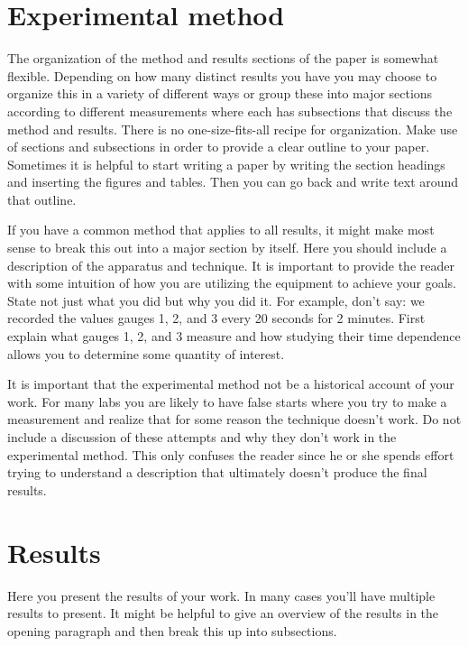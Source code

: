\documentclass[aps,prd,reprint]{revtex4-1}
\begin{document}
\section{Experimental method}

The organization of the method and results sections of the paper is somewhat flexible.  Depending on how many distinct results you have you may choose to organize this in a variety of different ways or group these into major sections according to different measurements where each has subsections that discuss the method and results.  There is no one-size-fits-all recipe for organization.  Make use of sections and subsections in order to provide a clear outline to your paper.  Sometimes it is helpful to start writing a paper by writing the section headings and inserting the figures and tables.  Then you can go back and write text around that outline.

If you have a common method that applies to all results, it might make most sense to break this out into a major section by itself.  Here you should include a description of the apparatus and technique.  It is important to provide the reader with some intuition of how you are utilizing the equipment to achieve your goals.  State not just what you did but why you did it.  For example, don't say:  we recorded the values gauges 1, 2, and 3 every 20 seconds for 2 minutes.  First explain what gauges 1, 2, and 3 measure and how studying their time dependence allows you to determine some quantity of interest.

It is important that the experimental method not be a historical account of your work.  For many labs you are likely to have false starts where you try to make a measurement and realize that for some reason the technique doesn't work.  Do not include a discussion of these attempts and why they don't work in the experimental method.  This only confuses the reader since he or she spends effort trying to understand a description that ultimately doesn't produce the final results.

\section{Results}

Here you present the results of your work.  In many cases you'll have multiple results to present.  It might be helpful to give an overview of the results in the opening paragraph and then break this up into subsections.

\end{document}
